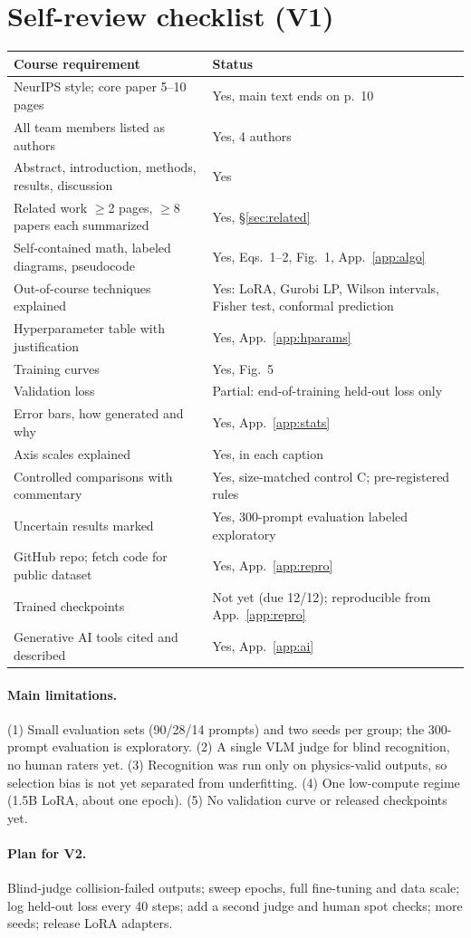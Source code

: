 \documentclass{article}
\begin{document}
\section{Self-review checklist (V1)}
\label{app:selfreview}
\begin{table}[h]
\centering\small
\begin{tabularx}{\linewidth}{@{}>{\raggedright\arraybackslash}X>{\raggedright\arraybackslash}X@{}}
\toprule
Course requirement & Status \\
\midrule
NeurIPS style; core paper 5--10 pages & Yes, main text ends on p.~10 \\
All team members listed as authors & Yes, 4 authors \\
Abstract, introduction, methods, results, discussion & Yes \\
Related work $\ge$2 pages, $\ge$8 papers each summarized & Yes, \S\ref{sec:related} \\
Self-contained math, labeled diagrams, pseudocode & Yes, Eqs.~1--2, Fig.~1, App.~\ref{app:algo} \\
Out-of-course techniques explained & Yes: LoRA, Gurobi LP, Wilson intervals, Fisher test, conformal prediction \\
Hyperparameter table with justification & Yes, App.~\ref{app:hparams} \\
Training curves & Yes, Fig.~5 \\
Validation loss & Partial: end-of-training held-out loss only \\
Error bars, how generated and why & Yes, App.~\ref{app:stats} \\
Axis scales explained & Yes, in each caption \\
Controlled comparisons with commentary & Yes, size-matched control C; pre-registered rules \\
Uncertain results marked & Yes, 300-prompt evaluation labeled exploratory \\
GitHub repo; fetch code for public dataset & Yes, App.~\ref{app:repro} \\
Trained checkpoints & Not yet (due 12/12); reproducible from App.~\ref{app:repro} \\
Generative AI tools cited and described & Yes, App.~\ref{app:ai} \\
\bottomrule
\end{tabularx}
\end{table}

\paragraph{Main limitations.} (1) Small evaluation sets (90/28/14 prompts) and two seeds per group; the 300-prompt evaluation is exploratory. (2) A single VLM judge for blind recognition, no human raters yet. (3) Recognition was run only on physics-valid outputs, so selection bias is not yet separated from underfitting. (4) One low-compute regime (1.5B LoRA, about one epoch). (5) No validation curve or released checkpoints yet.

\paragraph{Plan for V2.} Blind-judge collision-failed outputs; sweep epochs, full fine-tuning and data scale; log held-out loss every 40 steps; add a second judge and human spot checks; more seeds; release LoRA adapters.
\end{document}
